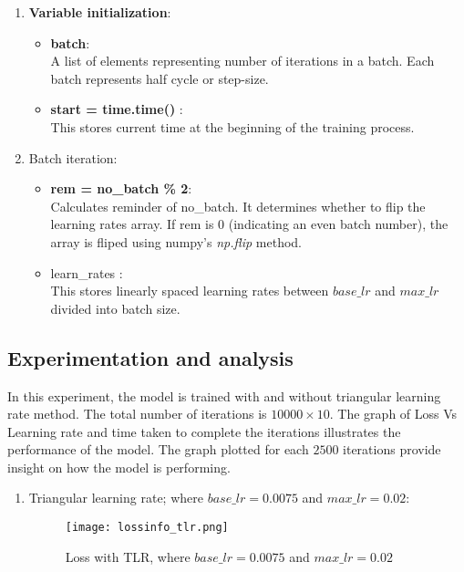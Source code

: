 \begin{enumerate}
    \item \textbf{Variable initialization}: 
    \begin{itemize}
        \item \textbf{batch}: \\ A list of elements representing number of iterations in a batch. Each batch represents half cycle or step-size.
        \item \textbf{start = time.time()} :\\ This stores current time at the beginning of the training process.
    \end{itemize}
    \item Batch iteration: \\
     \begin{itemize}
        \item \textbf{rem = no\_batch \% 2}: \\ Calculates reminder of no\_batch. It determines whether to flip the learning rates array. If rem is 0 (indicating an even batch number), the array is fliped using numpy's \parencite{harris2020array} \textit{np.flip} method.
        \item learn\_rates :\\ This stores linearly spaced learning rates between $base\_lr$ and $max\_lr$ divided into batch size.
    \end{itemize}
    
    
\end{enumerate}


\subsection{Experimentation and analysis}
In this experiment, the model is trained with and without triangular learning rate method. The total number of iterations is $10000 \times 10$. The graph of Loss Vs Learning rate and time taken to complete the iterations illustrates the performance of the model. The graph plotted for each $2500$ iterations provide insight on how the model is performing. 
\begin{enumerate}
    \item Triangular learning rate; where $base\_lr =0.0075$ and $max\_lr=0.02$: \\
    
    \begin{figure}[H]
        \centering    
        \texttt{[image: lossinfo\_tlr.png]}
        \caption{Loss with TLR, where $base\_lr =0.0075$ and $max\_lr=0.02$
        }
        \label{fig:trl_loss}
    \end{figure}

   
    
\end{enumerate}


